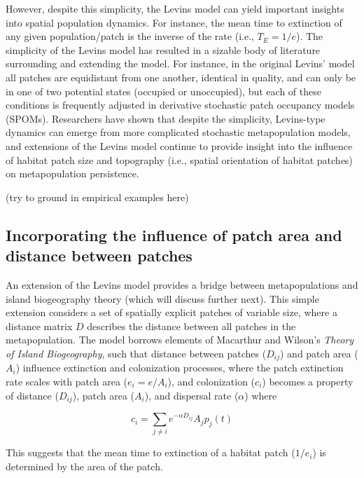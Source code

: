 \documentclass[12pt]{article}
\begin{document}
However, despite this simplicity, the Levins model can yield important insights into spatial population dynamics. For instance, the mean time to extinction of any given population/patch is the inverse of the rate (i.e., $T_E=1/e$). The simplicity of the Levins model has resulted in a sizable body of literature surrounding and extending the model. For instance, in the original Levins' model all patches are equidistant from one another, identical in quality, and can only be in one of two potential states (occupied or unoccupied), but each of these conditions is frequently adjusted in derivative stochastic patch occupancy models (SPOMs). Researchers have shown that despite the simplicity, Levins-type dynamics can emerge from more complicated stochastic metapopulation models, and extensions of the Levins model continue to provide insight into the influence of habitat patch size and topography (i.e., spatial orientation of habitat patches) on metapopulation persistence.




(try to ground in empirical examples here)





\bigskip
\subsection*{Incorporating the influence of patch area and distance between patches}

An extension of the Levins model provides a bridge between metapopulations and island biogeography theory (which will discuss further next). This simple extension considers a set of spatially explicit patches of variable size, where a distance matrix $D$ describes the distance between all patches in the metapopulation. The model borrows elements of Macarthur and Wilson's \textit{Theory of Island Biogeography}, such that distance between patches ($D_{ij}$) and patch area ($A_{i}$) influence extinction and colonization processes, where the patch extinction rate scales with patch area ($e_{i} = e / A_{i}$), and colonization ($c_{i}$) becomes a property of distance ($D_{ij}$), patch area ($A_{i}$), and dispersal rate ($\alpha$) where  

\begin{equation}
c_{i} = \sum_{j \ne i}e^{-\alpha D_{ij}} A_{j}p_{j}(t)
\end{equation}


\noindent This suggests that the mean time to extinction of a habitat patch ($1 / e_{i}$) is determined by the area of the patch. 
\end{document}
